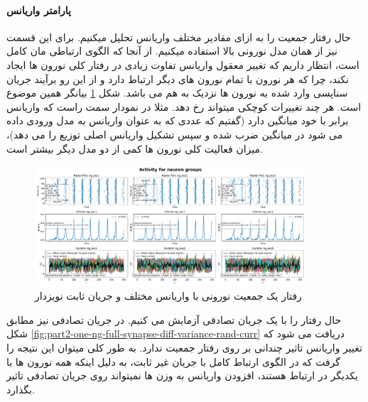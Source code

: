 \documentclass{report}
\begin{document}
            \paragraph*{پارامتر واریانس}
                حال رفتار جمعیت را به ازای مقادیر مختلف واریانس تحلیل میکنیم. برای این قسمت نیز از همان مدل نورونی بالا استفاده میکنیم. از آنجا که الگوی ارتباطی مان کامل است، انتظار داریم که تغییر معقول واریانس تفاوت زیادی در رفتار کلی نورون ها ایجاد نکند، چرا که هر نورون با تمام نورون های دیگر ارتباط دارد و از این رو برآیند جریان سناپسی وارد شده به نورون ها نزدیک به هم می باشد. شکل 
                \ref{fig:part2-one-ng-full-synapse-diff-variance}
                بیانگر همین موضوع است. هر چند تغییرات کوچکی میتواند رخ دهد. مثلا در نمودار سمت راست که واریانس برابر با خود میانگین دارد
                (گفتیم که عددی که به عنوان واریانس به مدل ورودی داده می شود در میانگین ضرب شده و سپس تشکیل واریانس اصلی توزیع را می دهد)،
                میزان فعالیت کلی نورون ها کمی از دو مدل دیگر بیشتر است.
                \begin{figure}[!ht]
                    \centering
                    \includegraphics[width=0.9\textwidth]{plots/part2-one-ng-full-synapse-diff-variance.pdf} 
                    \caption{رفتار یک جمعیت نورونی با واریانس مختلف و جریان ثابت نویزدار}
                    \label{fig:part2-one-ng-full-synapse-diff-variance}
                \end{figure}

                حال رفتار را با یک جریان تصادفی آزمایش می کنیم. در جریان تصادفی نیز مطابق شکل
                \ref{fig:part2-one-ng-full-synapse-diff-variance-rand-curr}
                دریافت می شود که تغییر واریانس تاثیر چندانی بر روی رفتار جمعیت ندارد. به طور کلی میتوان این نتیجه را گرفت که در الگوی ارتباط کامل با جریان غیر ثابت، به دلیل اینکه همه نورون ها با یکدیگر در ارتباط هستند، افزودن واریانس به وزن ها نمیتواند روی جریان تصادفی تاثیر بگذارد.
\end{document}
